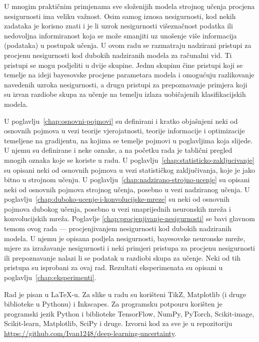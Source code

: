 \documentclass[utf8, diplomski, lmodern]{fer}
\begin{document}
U mnogim praktičnim primjenama sve složenijih modela strojnog učenja procjena nesigurnosti ima veliku važnost. Osim samog iznosa nesigurnosti, kod nekih zadataka je korisno znati i je li uzrok nesigurnosti višeznačnost podatka ili nedovoljna informiranost koja se može smanjiti uz unošenje više informacija (podataka) u postupak učenja. U ovom radu se razmatraju nadzirani pristupi za procjenu nesigurnosti kod dubokih nadziranih modela za računalni vid. Ti pristupi se mogu podjeliti u dvije skupine. Jednu skupinu čine pristupi koji se temelje na ideji bayesovske procjene parametara modela i omogućuju razlikovanje navedenih uzroka nesigurnosti, a drugu pristupi za prepoznavanje primjera koji su izvan razdiobe skupa za učenje na temelju izlaza uobičajenih klasifikacijskih modela.

U poglavlju~\ref{chap:osnovni-pojmovi} su definirani i kratko objašnjeni neki od osnovnih pojmova u vezi teorije vjerojatnosti, teorije informacije i optimizacije temeljene na gradijentu, na kojima se temelje pojmovi u poglavljima koja slijede. U njemu su definirane i neke oznake, a na početku rada je tablični pregled mnogih oznaka koje se koriste u radu. 
U poglavlju~\ref{chap:statisticko-zakljucivanje} su opisani neki od osnovnih pojmova u vezi statističkog zaključivanja, koje je jako bitno u strojnom učenju.
U poglavlju~\ref{chap:nadzirano-strojno-ucenje} su opisani neki od osnovnih pojmova strojnog učenja, posebno u vezi nadziranog učenja.
U poglavlju~\ref{chap:duboko-ucenje-i-konvolucijske-mreze} su neki od osnovnih pojmova dubokog učenja, posebno u vezi unaprijednih neuronskih mreža i konvolucijskih mreža.
Poglavlje \ref{chap:procjenjivanje-nesigurnosti} se bavi glavnom temom ovog rada --- procjenjivanjem nesigurnosti kod dubokih nadziranih modela. U njemu je opisana podjela nesigurnosti, bayesovske neuronske mreže, mjere za izražavanje nesigurnosti i neki primjeri pristupa za procjenu nesigurnosti ili prepoznavanje nalazi li se podatak u razdiobi skupa za učenje. Neki od tih pristupa \citep{Kendall:2017:WUNBDLCV,Hendrycks:2016:BDMOODE,Liang:2017:PDOODENN} su isprobani za ovaj rad. Rezultati eksperimenata su opisani u poglavlju~\ref{chap:eksperimenti}.

Rad je pisan u \LaTeX-u. Za slike u radu su korišteni TikZ, Matplotlib (i druge biblioteke u Pythonu) i Inkscapes. Za programsku potpouru korišten je programski jezik Python i biblioteke TensorFlow, NumPy, PyTorch, Scikit-image, Scikit-learn, Matplotlib, SciPy i druge. Izvorni kod za sve je u repozitoriju \url{https://github.com/Ivan1248/deep-learning-uncertainty}.
\end{document}
